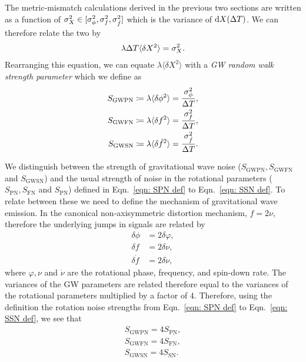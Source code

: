 \documentclass[../full_thesis/full_thesis.tex]{subfiles}
\begin{document}
The metric-mismatch calculations derived in the previous two sections are
written as a function of $\sigma_{X}^{2} \in [\sigma_{\phi}^{2}, \sigma_{f}^{2}, \sigma_{\dot{f}}^{2}]$
which is the variance of $\mathrm{d} X(\Delta T)$. We can therefore relate the two by
\begin{align}
\lambda \Delta T \langle \delta X^{2}\rangle = \sigma_{X}^{2}.
\end{align}
Rearranging this equation, we can equate $\lambda \langle \delta X^2\rangle$ with
a \emph{GW random walk strength parameter} which we define as
\begin{align}
S_{\mathrm{GWPN}} & \coloneqq \lambda \langle \delta \phi^{2} \rangle =
\frac{\sigma_{\phi}^{2}}{\Delta T}, \label{eqn: SPN 2}\\
S_{\mathrm{GWFN}} & \coloneqq \lambda \langle \delta f^{2} \rangle =
\frac{\sigma_{f}^{2}}{\Delta T}, \label{eqn: SFN 2}\\
S_{\mathrm{GWSN}} & \coloneqq \lambda \langle \delta \dot{f}^{2} \rangle =
\frac{\sigma_{\dot{f}}^{2}}{\Delta T}.  \label{eqn: SSN 2}
\end{align}

We distinguish between the strength of gravitational wave noise
($S_{\textrm{GWPN}}, S_{\textrm{GWFN}}$ and $S_{\textrm{GWSN}}$) and the usual
strength of noise in the rotational parameters ($S_{\textrm{PN}},
S_{\textrm{FN}}$ and $S_{\textrm{PN}}$) defined in Eqn.~\eqref{eqn: SPN def} to
Eqn.~\eqref{eqn: SSN def}. To relate between these we need to define the
mechanism of gravitational wave emission. In the canonical non-axisymmetric
distortion mechanism, $f = 2\nu$, therefore the underlying jumps in signals are
related by
\begin{align}
\delta \phi & = 2\delta \varphi, \\
\delta f & = 2\delta\nu, \\
\delta \dot{f}& =2\delta\dot{\nu},
\end{align}
where $\varphi, \nu$ and $\dot{\nu}$ are the rotational phase,
frequency, and spin-down rate. The variances of the GW parameters are related
therefore equal to the variances of the rotational parameters multiplied by a
factor of $4$. Therefore, using the definition the rotation noise strengths from
Eqn.~\eqref{eqn: SPN def} to Eqn.~\eqref{eqn: SSN def}, we see that
\begin{align}
S_{\textrm{GWPN}} = 4S_{\textrm{PN}}, \\
S_{\textrm{GWFN}} = 4S_{\textrm{FN}}, \label{eqn: relation}\\
S_{\textrm{GWSN}} = 4S_{\textrm{SN}}.
\end{align}
\end{document}

